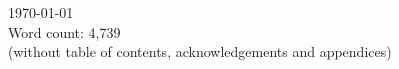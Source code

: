 \documentclass[
11pt, %
oneside, %
english, %
doublespacing,
headsepline, %
]{MastersDoctoralThesis} %
\begin{document}
\begin{titlepage}
\begin{center}
{\large \today}\\[2cm] %
 
 {Word count: 4,739\\ (without table of contents, acknowledgements and appendices)}\\[2cm] %
 
\vfill
\end{center}
\end{titlepage}


\end{document}
